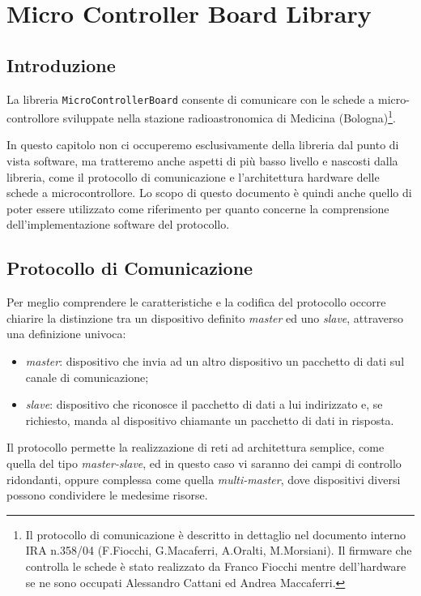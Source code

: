 \chapter{Micro Controller Board Library}

\section{Introduzione}

La libreria \texttt{MicroControllerBoard} consente di comunicare con le schede a micro-controllore
sviluppate nella stazione radioastronomica di Medicina (Bologna)\footnote{Il protocollo di comunicazione 
\`e descritto in dettaglio nel documento interno IRA n.358/04 (F.Fiocchi, G.Macaferri, A.Oralti, M.Morsiani). 
Il firmware che controlla le schede \`e stato realizzato da Franco Fiocchi mentre dell'hardware se ne sono 
occupati Alessandro Cattani ed Andrea Maccaferri.}.

In questo capitolo non ci occuperemo esclusivamente della libreria dal punto di vista software,
ma tratteremo anche aspetti di pi\`u basso livello e nascosti dalla libreria,  come il protocollo di comunicazione e l'architettura
hardware delle schede a microcontrollore. Lo scopo di questo documento \`e quindi anche quello di poter essere utilizzato
come riferimento per quanto concerne la comprensione dell'implementazione software del protocollo.


\section{Protocollo di Comunicazione\label{sec:protocollo}}
Per meglio comprendere le caratteristiche e la codifica del protocollo occorre chiarire la distinzione tra
un dispositivo definito \emph{master} ed uno \emph{slave}, attraverso una definizione univoca:
\begin{itemize}
\item \emph{master}: dispositivo che invia ad un altro dispositivo un pacchetto di dati sul canale di comunicazione;
\item \emph{slave}: dispositivo che riconosce il pacchetto di dati a lui indirizzato e, se richiesto, manda
al dispositivo chiamante un pacchetto di dati in risposta.
\end{itemize}
Il protocollo permette la realizzazione di reti ad architettura semplice, come quella del tipo 
\emph{master-slave}, ed in questo caso vi saranno dei campi di controllo ridondanti, 
oppure complessa come quella \emph{multi-master}, dove dispositivi diversi possono condividere le medesime risorse.


